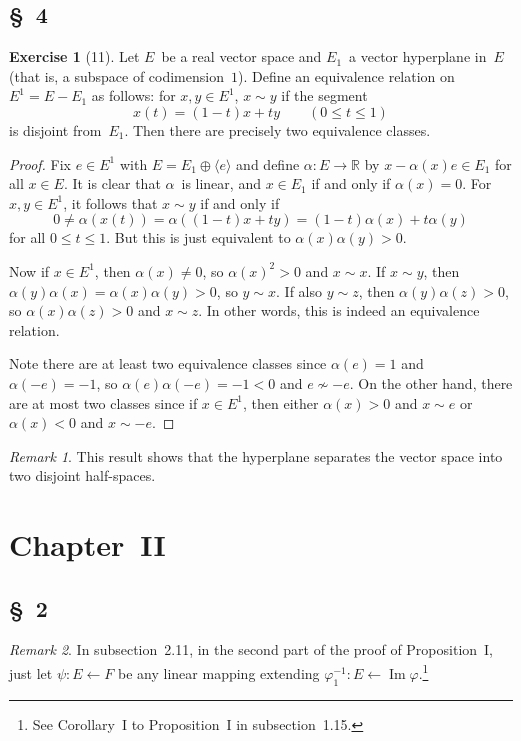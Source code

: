 \documentclass[letterpaper,12pt]{article}
\newcommand{\R}{\mathbb{R}}
\newcommand{\from}{\leftarrow}
\renewcommand{\equiv}{\sim}
\DeclareMathOperator{\im}{Im}
\newcommand{\dsum}{\oplus}
\newcommand{\gen}[1]{\langle#1\rangle}
\theoremstyle{definition}
\newtheorem*{exer}{Exercise}
\theoremstyle{remark}
\newtheorem*{rmk}{Remark}
\begin{document}
\subsection*{\S~4}
\begin{exer}[11]
Let \(E\)~be a real vector space and \(E_1\)~a vector hyperplane in~\(E\) (that is, a subspace of codimension~\(1\)). Define an equivalence relation on \(E^1=E-E_1\) as follows: for \(x,y\in E^1\), \(x\equiv y\) if the segment
\[x(t)=(1-t)x+ty\qquad(0\le t\le 1)\]
is disjoint from~\(E_1\). Then there are precisely two equivalence classes.
\end{exer}
\begin{proof}
Fix \(e\in E^1\) with \(E=E_1\dsum\gen{e}\) and define \(\alpha:E\to\R\) by \(x-\alpha(x)e\in E_1\) for all \(x\in E\). It is clear that \(\alpha\)~is linear, and \(x\in E_1\) if and only if \(\alpha(x)=0\). For \(x,y\in E^1\), it follows that \(x\equiv y\) if and only if
\[0\ne\alpha(x(t))=\alpha((1-t)x+ty)=(1-t)\alpha(x)+t\alpha(y)\]
for all \(0\le t\le 1\). But this is just equivalent to \(\alpha(x)\alpha(y)>0\).

Now if \(x\in E^1\), then \(\alpha(x)\ne0\), so \(\alpha(x)^2>0\) and \(x\equiv x\). If \(x\equiv y\), then \(\alpha(y)\alpha(x)=\alpha(x)\alpha(y)>0\), so \(y\equiv x\). If also \(y\equiv z\), then \(\alpha(y)\alpha(z)>0\), so \(\alpha(x)\alpha(z)>0\) and \(x\equiv z\). In other words, this is indeed an equivalence relation.

Note there are at least two equivalence classes since \(\alpha(e)=1\) and \(\alpha(-e)=-1\), so \(\alpha(e)\alpha(-e)=-1<0\) and \(e\not\equiv -e\). On the other hand, there are at most two classes since if \(x\in E^1\), then either \(\alpha(x)>0\) and \(x\equiv e\) or \(\alpha(x)<0\) and \(x\equiv -e\).
\end{proof}
\begin{rmk}
This result shows that the hyperplane separates the vector space into two disjoint half-spaces.
\end{rmk}

\section*{Chapter~II}
\subsection*{\S~2}
\begin{rmk}
In subsection~2.11, in the second part of the proof of Proposition~I, just let \(\psi:E\from F\) be any linear mapping extending \(\varphi_1^{-1}:E\from\im\varphi\).\footnote{See Corollary~I to Proposition~I in subsection~1.15.}
\end{rmk}
\end{document}
